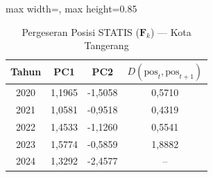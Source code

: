 \begin{table}[H]
\centering
\caption{Pergeseran Posisi STATIS ($\mathbf{F}_k$) --- Kota Tangerang} \label{tab:app1jarak_statis_skor_kota_tangerang}
\begin{adjustbox}{max width=\textwidth, max height=0.85\textheight}
\begin{tabular}{|c|c|c|c|}
\hline
\textbf{Tahun} & \textbf{PC1} & \textbf{PC2} & \textbf{$D(\text{pos}_t, \text{pos}_{t+1})$} \\
\hline
2020 & 1,1965 & -1,5058 & 0,5710 \\
2021 & 1,0581 & -0,9518 & 0,4319 \\
2022 & 1,4533 & -1,1260 & 0,5541 \\
2023 & 1,5774 & -0,5859 & 1,8882 \\
2024 & 1,3292 & -2,4577 & -- \\
\hline
\end{tabular}
\end{adjustbox}
\end{table}